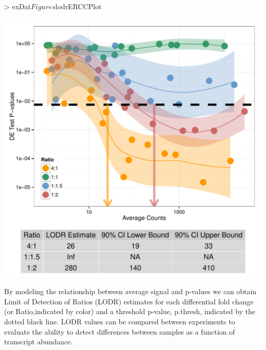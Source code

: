 \documentclass{article}
\begin{document}
\begin{center}
\begin{Schunk}
\begin{Sinput}
> exDat$Figures$lodrERCCPlot
\end{Sinput}
\end{Schunk}
\includegraphics{erccdashboardVignette-ratPlotC}
\end{center}
By modeling the relationship between average signal and p-values we can obtain 
Limit of Detection of Ratios (LODR) estimates for each differential fold change 
(or Ratio,indicated by color) and a threshold p-value, p.thresh, indicated by 
the dotted black line. LODR values can be compared between
experiments to evaluate the ability to detect differences between samples as a function
of transcript abundance.
\clearpage
\end{document}
